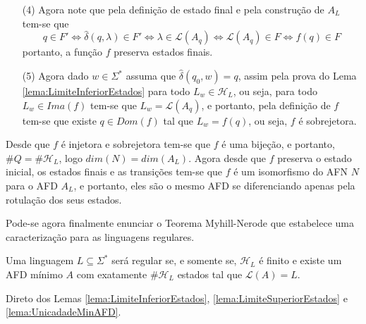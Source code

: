 \begin{prova}
\begin{itemize}
\begin{eqnarray*}
			& \Longleftrightarrow &  au \in \mathcal{L}(A_q)\\
			& \Longleftrightarrow &  au \in f(q)\\
			& \Longleftrightarrow &  au \in L_w\\
			& \Longleftrightarrow &  wau \in L\\
			& \Longleftrightarrow &  u \in L_{wa}
		\end{eqnarray*} 
		portanto, $f(p) = L_{wa}$, ou seja, $f$ preserva transições\footnote{Isto é o mesmo que dizer que $f(\delta'(q, a)) = \delta(f(q), a)$.}.
		\item[(4)] Agora note que pela definição de estado final e pela construção de $A_L$ tem-se que 
		$$q \in F' \Longleftrightarrow \widehat{\delta}(q, \lambda) \in F' \Longleftrightarrow  \lambda \in \mathcal{L}(A_q) \Longleftrightarrow \mathcal{L}(A_q) \in F \Longleftrightarrow f(q) \in F$$
		portanto, a função $f$ preserva estados finais.
		\item[(5)] Agora dado $w \in \Sigma^*$ assuma que $\widehat{\delta}(q_0, w) = q$, assim pela prova do Lema \ref{lema:LimiteInferiorEstados} para todo $L_w \in \mathcal{H}_L$, ou seja, para todo $L_w \in Ima(f)$ tem-se que $L_w = \mathcal{L}(A_q)$, e portanto, pela definição de $f$ tem-se que existe $q \in D	om(f)$ tal que $L_w = f(q)$, ou seja, $f$ é sobrejetora.
	\end{itemize}
	Desde que $f$ é injetora e sobrejetora tem-se que $f$ é uma bijeção, e portanto, $\#Q = \#\mathcal{H}_L$, logo $dim(N) = dim(A_L)$. Agora desde que $f$ preserva o estado inicial, os estados finais e as transições tem-se que $f$ é um isomorfismo do AFN $N$ para o AFD $A_L$, e portanto, eles são o mesmo AFD se diferenciando apenas pela rotulação dos seus estados. 
\end{prova}

Pode-se agora finalmente enunciar o Teorema Myhill-Nerode que estabelece uma caracterização para as linguagens regulares.

\begin{teorema}\label{teo:Myhill-Nerode}
	Uma linguagem $L \subseteq \Sigma^*$ será regular se, e somente se, $\mathcal{H}_L$ é finito e existe um AFD mínimo $A$ com exatamente $\# \mathcal{H}_L$ estados tal que $\mathcal{L}(A) = L$.
\end{teorema}

\begin{prova}
	Direto dos Lemas \ref{lema:LimiteInferiorEstados}, \ref{lema:LimiteSuperiorEstados} e \ref{lema:UnicadadeMinAFD}.
\end{prova}

